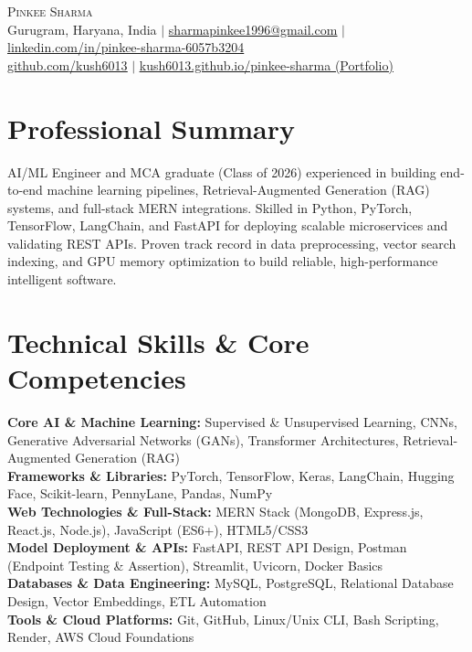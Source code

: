 \documentclass[letterpaper,10pt]{article}
\begin{document}
\begin{center}
    {\Huge \scshape Pinkee Sharma} \\ \vspace{2pt}
    \small Gurugram, Haryana, India $|$ \href{mailto:sharmapinkee1996@gmail.com}{\underline{sharmapinkee1996@gmail.com}} $|$ 
    \href{https://www.linkedin.com/in/pinkee-sharma-6057b3204}{\underline{linkedin.com/in/pinkee-sharma-6057b3204}} \\ \vspace{2pt}
    \href{https://github.com/kush6013}{\underline{github.com/kush6013}} $|$ 
    \href{https://kush6013.github.io/pinkee-sharma/}{\underline{kush6013.github.io/pinkee-sharma (Portfolio)}}
\end{center}

\section{Professional Summary}
\small{
AI/ML Engineer and MCA graduate (Class of 2026) experienced in building end-to-end machine learning pipelines, Retrieval-Augmented Generation (RAG) systems, and full-stack MERN integrations. Skilled in Python, PyTorch, TensorFlow, LangChain, and FastAPI for deploying scalable microservices and validating REST APIs. Proven track record in data preprocessing, vector search indexing, and GPU memory optimization to build reliable, high-performance intelligent software.
}

\section{Technical Skills \& Core Competencies}
\begin{itemize}[leftmargin=0.15in, label={}]
    \small{\item{
     \textbf{Core AI \& Machine Learning:} Supervised \& Unsupervised Learning, CNNs, Generative Adversarial Networks (GANs), Transformer Architectures, Retrieval-Augmented Generation (RAG) \\
     \textbf{Frameworks \& Libraries:} PyTorch, TensorFlow, Keras, LangChain, Hugging Face, Scikit-learn, PennyLane, Pandas, NumPy \\
     \textbf{Web Technologies \& Full-Stack:} MERN Stack (MongoDB, Express.js, React.js, Node.js), JavaScript (ES6+), HTML5/CSS3 \\
     \textbf{Model Deployment \& APIs:} FastAPI, REST API Design, Postman (Endpoint Testing \& Assertion), Streamlit, Uvicorn, Docker Basics \\
     \textbf{Databases \& Data Engineering:} MySQL, PostgreSQL, Relational Database Design, Vector Embeddings, ETL Automation \\
     \textbf{Tools \& Cloud Platforms:} Git, GitHub, Linux/Unix CLI, Bash Scripting, Render, AWS Cloud Foundations
    }}
\end{itemize}
\end{document}
